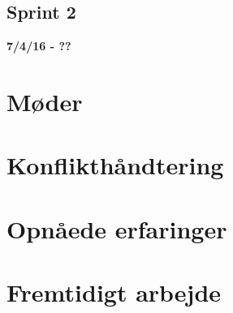 	\subsection{Sprint 2}
	\textbf{7/4/16 - ??}\newline

\section{Møder}

\section{Konflikthåndtering}

\section{Opnåede erfaringer}

\section{Fremtidigt arbejde}